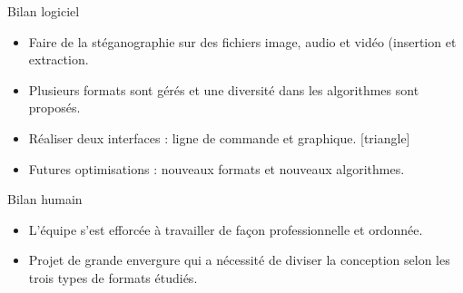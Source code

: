 \documentclass{beamer}
\begin{document}
  \begin{frame}
  
	\begin{block}{Bilan logiciel}
	\begin{itemize}
	[circle]
	\item Faire de la stéganographie sur des fichiers image, audio et vidéo
	(insertion et extraction. \checkmark
	\item Plusieurs formats sont gérés et une diversité dans les algorithmes 
	sont proposés. \checkmark
	\item Réaliser deux interfaces : ligne de commande et graphique. \checkmark
{}[triangle]
	\item Futures optimisations : nouveaux formats et nouveaux algorithmes. 

\end{itemize}
	
	\end{block}
	
	\begin{block}{Bilan humain}
	\begin{itemize}
	[circle]
	\item L'équipe s'est efforcée à travailler de façon professionnelle et ordonnée.
	\item Projet de grande envergure qui a nécessité de diviser la conception 
	selon les trois types de formats étudiés.  
	\end{itemize}
	\end{block}

	\end{frame}
  
  
\end{document}
